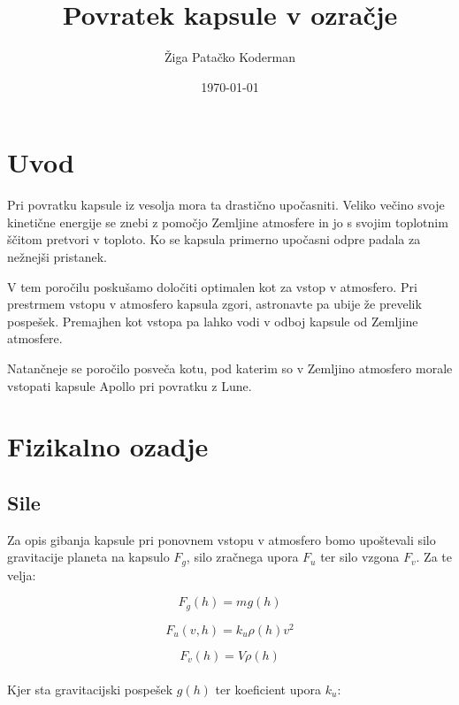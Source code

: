 \documentclass[11pt,a4paper]{article}
\begin{document}
\title{Povratek kapsule v ozra\v cje}
\author{\v Ziga Pata\v cko Koderman}
\date{\today}

\clearpage\maketitle
\thispagestyle{empty}
\pagebreak

\tableofcontents
\pagebreak

\section{Uvod}

Pri povratku kapsule iz vesolja mora ta drasti\v cno upo\v casniti. Veliko ve\v cino svoje kineti\v cne energije se znebi z pomo\v cjo Zemljine atmosfere in jo s svojim toplotnim \v s\v citom pretvori v toploto. Ko se kapsula primerno upo\v casni odpre padala za ne\v znej\v si pristanek.

V tem poro\v cilu posku\v samo dolo\v citi optimalen kot za vstop v atmosfero. Pri prestrmem vstopu v atmosfero kapsula zgori, astronavte pa ubije \v ze prevelik pospe\v sek. Premajhen kot vstopa pa lahko vodi v odboj kapsule od Zemljine atmosfere.

Natan\v cneje se poro\v cilo posve\v ca kotu, pod katerim so v Zemljino atmosfero morale vstopati kapsule Apollo pri povratku z Lune.

\pagebreak

\section{Fizikalno ozadje}
\subsection{Sile}

Za opis gibanja kapsule pri ponovnem vstopu v atmosfero bomo upo\v stevali silo gravitacije planeta na kapsulo $F_g$, silo zra\v cnega upora $F_u$ ter silo vzgona $F_v$. Za te velja:


\begin{equation}
F_g(h) = m g(h)
\end{equation}

\begin{equation}
F_u(v, h) = k_{u}\rho (h) v^2
\end{equation}

\begin{equation}
F_v(h) = V \rho(h)
\end{equation} \\
Kjer sta gravitacijski pospe\v sek $g(h)$ ter koeficient upora $k_u$:
\end{document}
